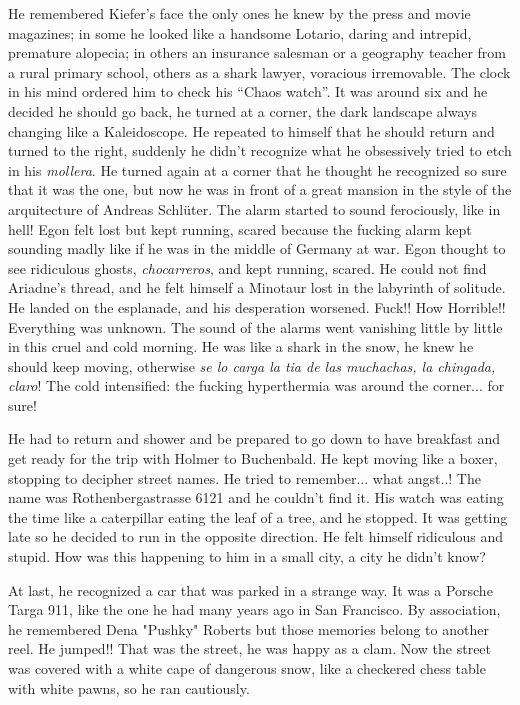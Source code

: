 \documentclass[smalldemyvopaper,11pt,twoside,onecolumn,openright,extrafontsizes]{memoir}
\begin{document}
He remembered Kiefer’s face the only ones he knew by the press and movie magazines; in some he looked like a handsome Lotario, daring and intrepid, premature alopecia; in others an insurance salesman or a geography teacher from a rural primary school, others as a shark lawyer, voracious irremovable. The clock in his mind ordered him to check his “Chaos watch”. It was around six and he decided he should go back, he turned at a corner, the dark landscape always changing like a Kaleidoscope. He repeated to himself that he should return and turned to the right, suddenly he didn’t recognize what he obsessively tried to etch in his \textit{mollera}. He turned again at a corner that he thought he recognized so sure that it was the one, but now he was in front of a great mansion in the style of the arquitecture of Andreas Schlüter. The alarm started to sound ferociously, like in hell! Egon felt lost but kept running, scared because the fucking alarm kept sounding madly like if he was in the middle of Germany at war. Egon thought to see ridiculous ghosts, \textit{chocarreros}, and kept running, scared. He could not find Ariadne’s thread, and he felt himself a Minotaur lost in the labyrinth of solitude. He landed on the esplanade, and his desperation worsened. Fuck!! How Horrible!!  Everything was unknown. The sound of the alarms went vanishing little by little in this cruel and cold morning. He was like a shark in the snow, he knew he should keep moving, otherwise \textit{se lo carga la tia de las muchachas, la chingada, claro}! The cold intensified: the fucking hyperthermia was around the corner... for sure!

He had to return and shower and be prepared to go down to have breakfast and get ready for the trip with Holmer to Buchenbald. He kept moving like a boxer, stopping to decipher street names. He tried to remember... what angst..! The name was Rothenbergastrasse 6121 and he couldn’t find it. His watch was eating the time like a caterpillar eating the leaf of a tree, and he stopped. It was getting late so he decided to run in the opposite direction. He felt himself ridiculous and stupid. How was this happening to him in a small city, a city he didn’t know?

At last, he recognized a car that was parked in a strange way. It was a Porsche Targa 911, like the one he had many years ago in San Francisco. By association, he remembered Dena "Pushky" Roberts but those memories belong to another reel. He jumped!! That was the street, he was happy as a clam. Now the street was covered with a white cape of dangerous snow, like a checkered chess table with white pawns, so he ran cautiously.
\end{document}
